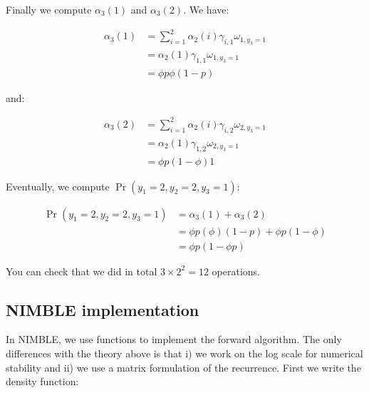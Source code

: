 \documentclass[
  12pt,
]{krantz}
\begin{document}
Finally we compute \(\alpha_3(1)\) and \(\alpha_3(2)\). We have:

\begin{align*}
\alpha_3(1) &= \sum_{i=1}^2 \alpha_2(i) \gamma_{i,1} \omega_{1,y_3=1}\\
            &= \alpha_2(1) \gamma_{1,1} \omega_{1,y_3=1}\\
            &= \phi p \phi (1-p)
\end{align*}

and:

\begin{align*}
\alpha_3(2) &= \sum_{i=1}^2 \alpha_2(i) \gamma_{i,2} \omega_{2,y_3=1}\\
            &= \alpha_2(1) \gamma_{1,2} \omega_{2,y_3=1}\\
            &= \phi p (1-\phi) 1
\end{align*}

Eventually, we compute \(\Pr(y_1=2,y_2=2,y_3=1)\):

\begin{align*}
\Pr(y_1=2,y_2=2,y_3=1) &= \alpha_3(1) + \alpha_3(2)\\
            &= \phi p (\phi) (1-p) + \phi p (1-\phi)\\
            &= \phi p (1-\phi p)
\end{align*}

You can check that we did in total \(3 \times 2^2 = 12\) operations.

\hypertarget{nimble-implementation-1}{%
\subsection{NIMBLE implementation}\label{nimble-implementation-1}}

In NIMBLE, we use functions to implement the forward algorithm. The only differences with the theory above is that i) we work on the log scale for numerical stability and ii) we use a matrix formulation of the recurrence.
First we write the density function:
\end{document}
